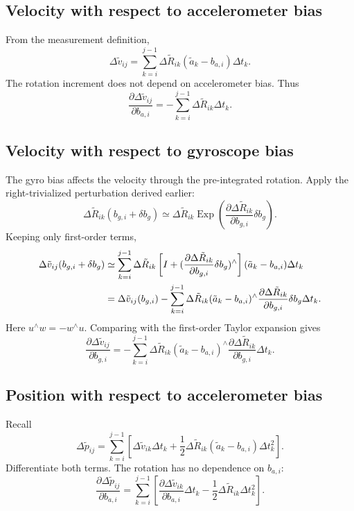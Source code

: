 \documentclass[11pt,a4paper]{article}
\newcommand{\Exp}{\operatorname{Exp}}
\begin{document}
\subsection{Velocity with respect to accelerometer bias}
From the measurement definition,
\begin{equation}
\Delta\tilde v_{ij}=\sum_{k=i}^{j-1}
\Delta\tilde R_{ik}(\tilde a_k-b_{a,i})\Delta t_k.
\end{equation}
The rotation increment does not depend on accelerometer bias. Thus
\begin{equation}\label{eq:Jvba_sum}
\boxed{\frac{\partial\Delta\tilde v_{ij}}{\partial b_{a,i}}
=-\sum_{k=i}^{j-1}\Delta\tilde R_{ik}\Delta t_k.}
\end{equation}

\subsection{Velocity with respect to gyroscope bias}
The gyro bias affects the velocity through the pre-integrated
rotation. Apply the right-trivialized perturbation derived earlier:
\begin{equation}
\Delta\tilde R_{ik}(b_{g,i}+\delta b_g)
\simeq\Delta\tilde R_{ik}
\Exp(\frac{\partial\Delta\tilde R_{ik}}{\partial b_{g,i}}\delta b_g).
\end{equation}
Keeping only first-order terms,
\begin{align}
\Delta\tilde v_{ij}(b_{g,i}+\delta b_g)
&\simeq\sum_{k=i}^{j-1}
\Delta\tilde R_{ik}
\left[I+(\frac{\partial\Delta\tilde R_{ik}}{\partial b_{g,i}}\delta b_g)^\wedge\right]
(\tilde a_k-b_{a,i})\Delta t_k\notag\\
&=\Delta\tilde v_{ij}(b_{g,i})
-\sum_{k=i}^{j-1}
\Delta\tilde R_{ik}(\tilde a_k-b_{a,i})^\wedge
\frac{\partial\Delta\tilde R_{ik}}{\partial b_{g,i}}\delta b_g\Delta t_k.
\end{align}
Here $u^\wedge w=-w^\wedge u$. Comparing with the first-order
Taylor expansion gives
\begin{equation}\label{eq:Jvbg_sum}
\boxed{\frac{\partial\Delta\tilde v_{ij}}{\partial b_{g,i}}
=-\sum_{k=i}^{j-1}
\Delta\tilde R_{ik}(\tilde a_k-b_{a,i})^\wedge
\frac{\partial\Delta\tilde R_{ik}}{\partial b_{g,i}}\Delta t_k.}
\end{equation}

\subsection{Position with respect to accelerometer bias}
Recall
\begin{equation}
\Delta\tilde p_{ij}
=\sum_{k=i}^{j-1}\left[
\Delta\tilde v_{ik}\Delta t_k+
\frac12\Delta\tilde R_{ik}
(\tilde a_k-b_{a,i})\Delta t_k^2\right].
\end{equation}
Differentiate both terms. The rotation has no dependence on $b_{a,i}$:
\begin{equation}\label{eq:Jpba_sum}
\boxed{\frac{\partial\Delta\tilde p_{ij}}{\partial b_{a,i}}
=\sum_{k=i}^{j-1}
\left[\frac{\partial\Delta\tilde v_{ik}}{\partial b_{a,i}}\Delta t_k
-\frac12\Delta\tilde R_{ik}\Delta t_k^2\right].}
\end{equation}
\end{document}
